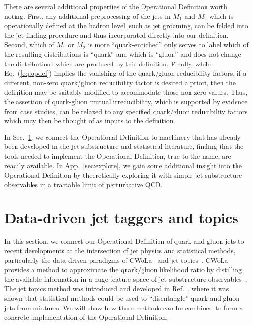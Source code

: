 \documentclass[letterpaper,11pt]{article}
\DeclareRobustCommand{\Sec}[1]{Sec.~\ref{#1}}
\DeclareRobustCommand{\App}[1]{App.~\ref{#1}}
\DeclareRobustCommand{\Eq}[1]{Eq.~(\ref{#1})}
\DeclareRobustCommand{\Ref}[1]{Ref.~\cite{#1}}
\begin{document}
There are several additional properties of the Operational Definition worth noting.
%
First, any additional preprocessing of the jets in $M_1$ and $M_2$ which is operationally defined at the hadron level, such as jet grooming, can be folded into the jet-finding procedure and thus incorporated directly into our definition.
%
Second, which of $M_1$ or $M_2$ is more ``quark-enriched'' only serves to label which of the resulting distributions is ``quark'' and which is ``gluon'' and does not change the distributions which are produced by this definition.
%
Finally, while \Eq{eq:opdef} implies the vanishing of the quark/gluon reducibility factors, if a different, non-zero quark/gluon reducibility factor is desired a priori, then the definition may be suitably modified to accommodate those non-zero values.
%
Thus, the assertion of quark-gluon mutual irreducibility, which is supported by evidence from case studies, can be relaxed to any specified quark/gluon reducibility factors which may then be thought of as inputs to the definition.

In \Sec{sec:topicwola}, we connect the Operational Definition to machinery that has already been developed in the jet substructure and statistical literature, finding that the tools needed to implement the Operational Definition, true to the name, are readily available.
%
In \App{sec:explore}, we gain some additional insight into the Operational Definition by theoretically exploring it with simple jet substructure observables in a tractable limit of perturbative QCD.



\section{Data-driven jet taggers and topics}
\label{sec:topicwola}

In this section, we connect our Operational Definition of quark and gluon jets to recent developments at the intersection of jet physics and statistical methods, particularly the data-driven paradigms of CWoLa~\cite{Metodiev:2017vrx} and jet topics~\cite{Metodiev:2018ftz}.
%
CWoLa provides a method to approximate the quark/gluon likelihood ratio by distilling the available information in a huge feature space of jet substructure observables~\cite{Metodiev:2017vrx, Cohen:2017exh, Komiske:2018oaa}.
%
The jet topics method was introduced and developed in \Ref{Metodiev:2018ftz}, where it was shown that statistical methods could be used to ``disentangle'' quark and gluon jets from mixtures.
%
We will show how these methods can be combined to form a concrete implementation of the Operational Definition. 
\end{document}
